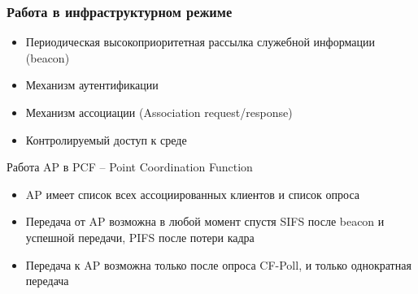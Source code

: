 \documentclass[utf8]{beamer}
\begin{document}
\begin{frame}
 \frametitle{Работа в инфраструктурном режиме}
\begin{itemize}
 \item Периодическая высокоприоритетная рассылка служебной информации (beacon)
 \item Механизм аутентификации
 \item Механизм ассоциации (Association request/response)
 \item Контролируемый доступ к среде
\end{itemize}
\begin{block}{Работа AP в PCF -- Point Coordination Function}
\begin{itemize}
 \item AP имеет список всех ассоциированных клиентов и список опроса
 \item Передача от AP возможна в любой момент спустя SIFS после beacon и успешной передачи, PIFS после потери кадра
 \item Передача к AP возможна только после опроса CF-Poll, и только однократная передача
\end{itemize}
\end{block}

\end{frame}
\end{document}
